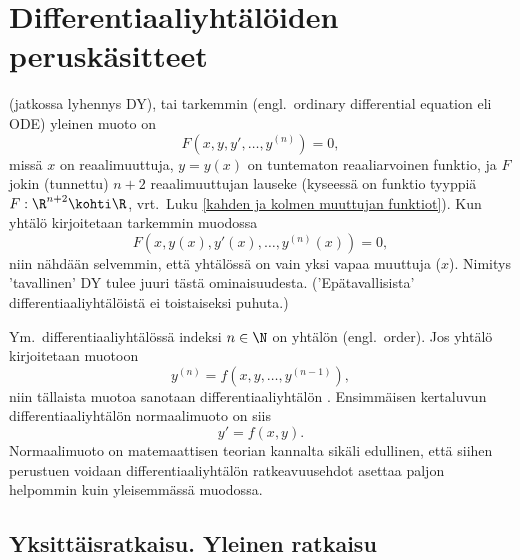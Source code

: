 \section{Differentiaaliyhtälöiden peruskäsitteet} \label{DY-käsitteet}
\alku

 (jatkossa lyhennys DY), tai tarkemmin 
 (engl.\ ordinary differential equation eli ODE) yleinen
muoto on 
\[
F(x,y,y',\ldots,y^{(n)})=0,
\]
missä $x$ on reaalimuuttuja, $y=y(x)$ on tuntematon reaaliarvoinen funktio, ja $F$ jokin
(tunnettu) $n+2$ reaalimuuttujan lauseke (kyseessä on funktio tyyppiä $F:\R^{n+2}\kohti\R$, 
vrt.\ Luku \ref{kahden ja kolmen muuttujan funktiot}). Kun yhtälö kirjoitetaan tarkemmin
muodossa
\[
F(x,y(x),y'(x),\ldots,y^{(n)}(x))=0,
\]
niin nähdään selvemmin, että yhtälössä on vain yksi vapaa muuttuja ($x$). Nimitys 'tavallinen'
DY tulee juuri tästä ominaisuudesta. ('Epätavallisista' differentiaaliyhtälöistä ei
toistaiseksi puhuta.)

Ym.\ differentiaaliyhtälössä indeksi $n\in\N$ on yhtälön
%
 (engl.\ order). Jos 
yhtälö kirjoitetaan muotoon
\[
y^{(n)}=f(x,y,\ldots,y^{(n-1)}),
\]
niin tällaista muotoa sanotaan differentiaaliyhtälön
. Ensimmäisen
kertaluvun differentiaaliyhtälön normaalimuoto on siis
\[
y'=f(x,y).
\]
Normaalimuoto on matemaattisen teorian kannalta sikäli edullinen, että siihen perustuen voidaan
differentiaaliyhtälön ratkeavuusehdot asettaa paljon helpommin kuin yleisemmässä muodossa.

\subsection{Yksittäisratkaisu.  Yleinen ratkaisu}

